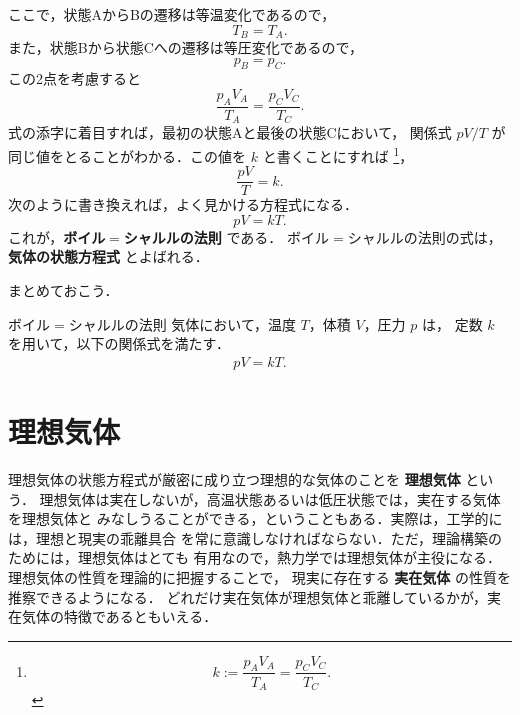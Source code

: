             ここで，状態AからBの遷移は等温変化であるので，
                \begin{equation*}
                    {T}_{B} = {T}_{A}.
                \end{equation*}
            また，状態Bから状態Cへの遷移は等圧変化であるので，
                \begin{equation*}
                    {p}_{B} = {p}_{C}.
                \end{equation*}
            この2点を考慮すると
                \begin{equation*}
                    \frac{{p}_{A}{V}_{A}}{{T}_{A}} = \frac{{p}_{C}{V}_{C}}{{T}_{C}}.
                \end{equation*}
            式の添字に着目すれば，最初の状態Aと最後の状態Cにおいて，
            関係式 $pV/T$ が同じ値をとることがわかる．この値を $k$ と書くことにすれば
                \footnote{
                    \begin{equation*}
                        k := \frac{{p}_{A}{V}_{A}}{{T}_{A}} = \frac{{p}_{C}{V}_{C}}{{T}_{C}}.
                    \end{equation*}
                }，
                \begin{equation*}
                    \frac{pV}{T} = k.
                \end{equation*}
            次のように書き換えれば，よく見かける方程式になる．
                \begin{equation*}
                    pV=kT.
                \end{equation*}
            これが，\textbf{ボイル$=$シャルルの法則} である．
            ボイル$=$シャルルの法則の式は，\textbf{気体の状態方程式} とよばれる．

            まとめておこう．
                \begin{myshadebox}{ボイル$=$シャルルの法則}
                    気体において，温度 $T$，体積 $V$，圧力 $p$ は，
                    定数 $k$ を用いて，以下の関係式を満たす．
                    \begin{align}
                        pV=kT.
                    \end{align}
                \end{myshadebox}

        \section{理想気体}
        理想気体の状態方程式が厳密に成り立つ理想的な気体のことを \textbf{理想気体} という．
        理想気体は実在しないが，高温状態あるいは低圧状態では，実在する気体を理想気体と
        みなしうることができる，ということもある．実際は，工学的には，理想と現実の乖離具合
        を常に意識しなければならない．ただ，理論構築のためには，理想気体はとても
        有用なので，熱力学では理想気体が主役になる．理想気体の性質を理論的に把握することで，
        現実に存在する \textbf{実在気体} の性質を推察できるようになる．
        どれだけ実在気体が理想気体と乖離しているかが，実在気体の特徴であるともいえる．


